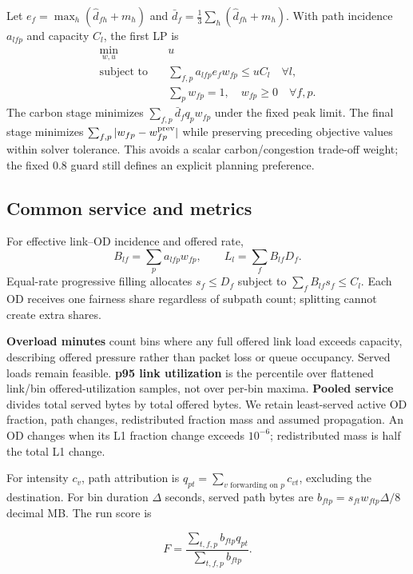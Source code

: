 \documentclass[conference,letterpaper]{IEEEtran}
\begin{document}
Let $e_f=\max_h(\widehat d_{fh}+m_h)$ and
$\bar d_f=\frac13\sum_h(\widehat d_{fh}+m_h)$.
With path incidence $a_{lfp}$ and capacity $C_l$, the first LP is
\begin{align}
 \min_{w,u}\quad &u \\
 \text{subject to}\quad &\sum_{f,p} a_{lfp}e_fw_{fp}\leq uC_l \quad \forall l,\\
 &\sum_p w_{fp}=1,\quad w_{fp}\geq0 \quad \forall f,p.
\end{align}
The carbon stage minimizes $\sum_{f,p}\bar d_fq_pw_{fp}$ under the fixed
peak limit. The final stage minimizes $\sum_{f,p}|w_{fp}-w^{\rm prev}_{fp}|$
while preserving preceding objective values within solver tolerance.
This avoids a scalar carbon/congestion trade-off weight; the fixed 0.8 guard
still defines an explicit planning preference.

\subsection{Common service and metrics}

For effective link--OD incidence and offered rate,
\begin{equation}
 B_{lf}=\sum_pa_{lfp}w_{fp},\qquad L_l=\sum_fB_{lf}D_f.
\end{equation}
Equal-rate progressive filling allocates $s_f\leq D_f$ subject to
$\sum_fB_{lf}s_f\leq C_l$. Each OD receives one fairness share regardless of
subpath count; splitting cannot create extra shares.

\textbf{Overload minutes} count bins where any full offered link load exceeds capacity, describing offered pressure rather than packet loss or queue occupancy. Served loads remain feasible. \textbf{p95 link utilization} is the percentile over flattened link/bin offered-utilization samples, not over per-bin maxima. \textbf{Pooled service} divides total served bytes by total offered bytes. We retain least-served active OD fraction, path changes, redistributed fraction mass and assumed propagation. An OD changes when its L1 fraction change exceeds $10^{-6}$; redistributed mass is half the total L1 change.

For intensity $c_v$, path attribution is
$q_{pt}=\sum_{v\text{ forwarding on }p}c_{vt}$, excluding the destination.
For bin duration $\Delta$ seconds, served path bytes are
$b_{ftp}=s_{ft}w_{ftp}\Delta/8$ decimal MB. The run score is

\[
F = \frac{\sum_{t,f,p} b_{ftp}q_{pt}}{\sum_{t,f,p} b_{ftp}}.
\]
\end{document}
